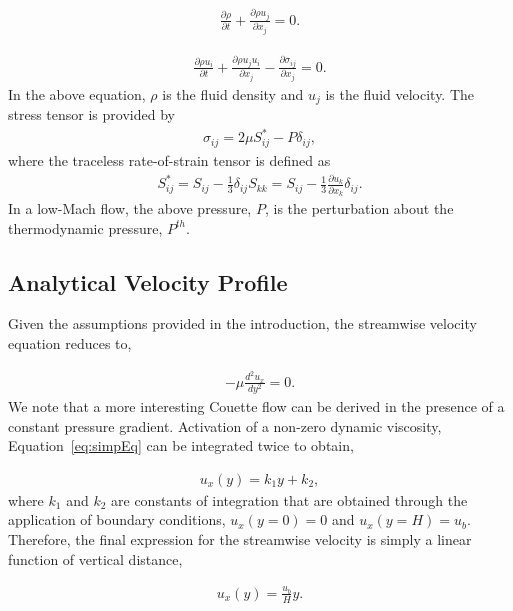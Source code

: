 \documentclass{article}
\begin{document}
\begin{align}
  \frac {\partial \rho }{\partial t} + \frac{ \partial \rho u_j}{\partial x_j} = 0.
\label{eq:contEq}
\end{align} 

\begin{align}
  \frac {\partial \rho u_i }{\partial t} + \frac{ \partial \rho u_j u_i}{\partial x_j} 
-\frac{\partial \sigma_{ij}}{\partial x_j} = 0.
\label{eq:momEq}
\end{align}
%
In the above equation, $\rho$ is the fluid density and $u_j$ is the fluid velocity. 
The stress tensor is provided by
\begin{align}
\sigma_{ij}  = 2 \mu S^*_{ij} - P \delta_{ij},
\end{align}
%
where the traceless rate-of-strain tensor is defined as
\begin{align}
S^*_{ij}  = S_{ij} - \frac{1}{3} \delta_{ij} S_{kk} \nonumber
		     = S_{ij} - \frac{1}{3} \frac{\partial  u_k }{\partial x_k}\delta_{ij}.
\end{align}
In a low-Mach flow, the above pressure, $P$, is the perturbation about the thermodynamic
pressure, $P^{th}$. 

\subsection{Analytical Velocity Profile}
Given the assumptions provided in the introduction, the streamwise velocity equation reduces to,

\begin{align}
   -\mu \frac{d^2 u_x}{dy^2} = 0.
\label{eq:simpEq}
\end{align}
We note that a more interesting Couette flow can be derived in the presence of a constant pressure 
gradient. Activation of a non-zero dynamic viscosity, Equation~\ref{eq:simpEq} can be 
integrated twice to obtain,

\begin{align}
  u_x(y) = k_1 y + k_2,
\label{eq:simpEqWithK}
\end{align}
where $k_1$ and $k_2$ are constants of integration that are obtained through the 
application of boundary conditions, $u_x(y=0) = 0$ and  $u_x(y=H) = u_b$. Therefore,
the final expression for the streamwise velocity is simply a linear function of vertical
distance,

\begin{align}
  u_x(y) = \frac{u_b}{H}y.
\label{eq:simpleEqWithoutK}
\end{align}
\end{document}
